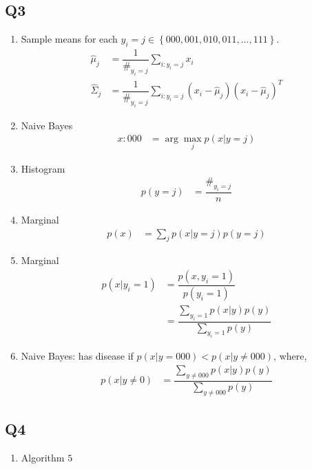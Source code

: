 \documentclass{article}
\begin{document}
\subsection{Q3}
\begin{enumerate}
\item Sample means for each $y_{i} = j \in \left\{000, 001, 010, 011, ..., 111\right\}$.
\begin{align*}
\hat{\mu}_{j} &= \dfrac{1}{\#_{y_{i} = j}} \displaystyle\sum_{i : y_{i} = j} x_{i}
\\ \hat{\Sigma}_{j} &= \dfrac{1}{\#_{y_{i} = j}} \displaystyle\sum_{i : y_{i} = j} \left(x_{i} - \hat{\mu}_{j}\right)\left(x_{i} - \hat{\mu}_{j}\right)^{T}
\end{align*}
\item Naive Bayes
\begin{align*}
x  : 000 &= \arg\displaystyle\max_{j} p\left(x | y = j \right)
\end{align*}
\item Histogram
\begin{align*}
p\left(y = j\right)  &= \dfrac{\#_{y_{i} = j}}{n}
\end{align*}
\item Marginal
\begin{align*}
p\left(x\right)  &= \displaystyle\sum_{j} p\left(x | y = j\right) p\left(y = j \right)
\end{align*}
\item Marginal
\begin{align*}
p\left(x | y_{i} = 1\right)  &= \dfrac{p\left(x, y_{i} = 1\right)}{p\left(y_{i} = 1\right)}
\\ &= \dfrac{\displaystyle\sum_{y_{i} = 1} p\left(x | y\right) p\left(y\right)}{\displaystyle\sum_{y_{i} = 1} p\left(y\right)}
\end{align*}
\item Naive Bayes: has disease if $p\left(x | y = 000\right)  < p\left(x | y \neq  000\right) $, where,
\begin{align*}
p\left(x | y \neq  0\right)  &= \dfrac{\displaystyle\sum_{y \neq  000} p\left(x | y\right) p\left(y\right)}{\displaystyle\sum_{y \neq  000} p\left(y\right)}
\end{align*}
\end{enumerate}


\subsection{Q4}
\begin{enumerate}
\item Algorithm $5$
\end{enumerate}
\end{document}
